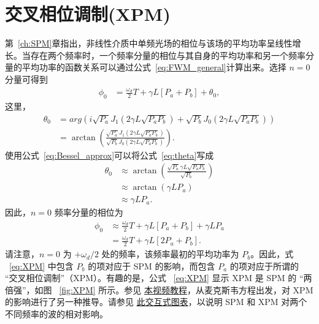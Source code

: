 \section{交叉相位调制(XPM)}
\label{Sec:XPM}
第~\ref{ch:SPM}章指出，非线性介质中单频光场的相位与该场的平均功率呈线性增长。当存在两个频率时，一个频率分量的相位与其自身的平均功率和另一个频率分量的平均功率的函数关系可以通过公式~\ref{eq:FWM_general}计算出来。选择 $n=0$ 分量可得到
\begin{align}
    \phi_0 &= \frac{\omega_d}{2}T+\gamma L [P_a+P_b]+\theta_0,
\end{align}
这里，
\begin{align}
\label{eq:theta}
    \theta_0 &= arg\left( i\sqrt{P_a}J_{1}\left(2\gamma L\sqrt{P_aP_b}\right)+\sqrt{P_b}J_0\left(2\gamma L\sqrt{P_aP_b}\right) \right) \\ \nonumber
    &= \arctan\left(\frac{\sqrt{P_a}J_{1}\left(2\gamma L\sqrt{P_aP_b}\right)}{\sqrt{P_b}J_0\left(2\gamma L\sqrt{P_aP_b}\right) } \right).
\end{align}
使用公式~\ref{eq:Bessel_approx}可以将公式~\ref{eq:theta}写成
\begin{align}
    \theta_0 &\approx\arctan\left(\frac{\sqrt{P_a}\gamma L\sqrt{P_aP_b}}{\sqrt{P_b} } \right) \\ \nonumber
    &\approx\arctan\left(\gamma LP_a\right) \\ \nonumber
    &\approx \gamma LP_a.
\end{align}
因此，$n=0$ 频率分量的相位为
\begin{align}
    \label{eq:XPM}
    \phi_0 &\approx \frac{\omega_d}{2}T+\gamma L [P_a+P_b]+\gamma LP_a \\ \nonumber
    &=\frac{\omega_d}{2}T+\gamma L [2P_a+P_b].
\end{align}
请注意，$n=0$ 为 $+\omega_d/2$ 处的频率，该频率最初的平均功率为 $P_b$。因此，式 ~\ref{eq:XPM} 中包含 $P_b$ 的项对应于 SPM 的影响，而包含 $P_a$ 的项对应于所谓的 “交叉相位调制”（XPM）。有趣的是，公式 ~\ref{eq:XPM} 显示 XPM 是 SPM 的 “两倍强”，如图 ~\ref{fig:XPM} 所示。参见 \href{https://youtu.be/aDXd13zLPC4}{本视频教程}，从麦克斯韦方程出发，对 XPM 的影响进行了另一种推导。请参见 \href{https://www.desmos.com/calculator/vstlwgtlyb}{此交互式图表}，以说明 SPM 和 XPM 对两个不同频率的波的相对影响。
